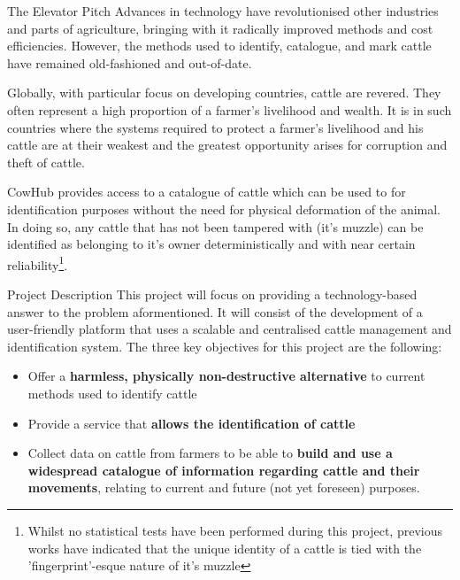 

\begin{subsection}{The Elevator Pitch}
  Advances in technology have revolutionised other industries and parts of agriculture, bringing with it radically improved methods and cost efficiencies. However, the methods used to identify, catalogue, and mark cattle have remained old-fashioned and out-of-date.

  Globally, with particular focus on developing countries, cattle are revered. They often represent a high proportion of a farmer's livelihood and wealth. It is in such countries where the systems required to protect a farmer's livelihood and his cattle are at their weakest and the greatest opportunity arises for corruption and theft of cattle.

  CowHub provides access to a catalogue of cattle which can be used to for identification purposes without the need for physical deformation of the animal. In doing so, any cattle that has not been tampered with (it's muzzle) can be identified as belonging to it's owner deterministically and with near certain reliability\footnote{Whilst no statistical tests have been performed during this project, previous works have indicated that the unique identity of a cattle is tied with the 'fingerprint'-esque nature of it's muzzle}.
\end{subsection}


\begin{subsection}{Project Description}
  This project will focus on providing a technology-based answer to the problem aformentioned. It will consist of the development of a user-friendly platform that uses a scalable and centralised cattle management and identification system. The three key objectives for this project are the following:

  \begin{itemize}
  	\item Offer a \textbf{harmless, physically non-destructive alternative} to current methods used to identify cattle
  	\item Provide a service that \textbf{allows the identification of cattle}
  	\item Collect data on cattle from farmers to be able to \textbf{build and use a widespread catalogue of information regarding cattle and their movements}, relating to current and future (not yet foreseen) purposes.
  \end{itemize}

\end{subsection}

